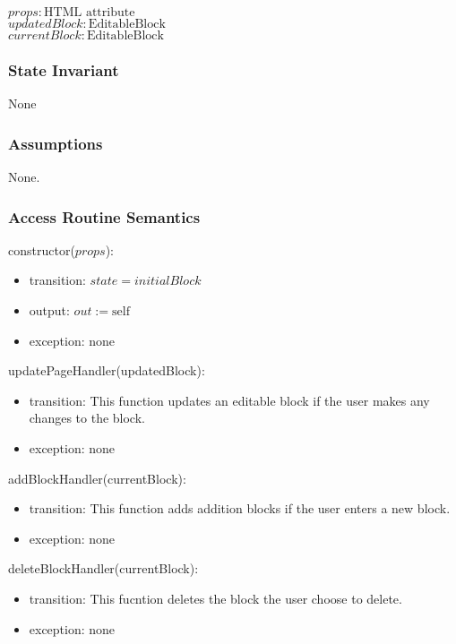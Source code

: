 \documentclass[12pt, titlepage]{article}
\begin{document}
$\mathit{props}: \text{HTML attribute}$\\
$\mathit{updatedBlock}: \text{EditableBlock}$\\
$\mathit{currentBlock}: \text{EditableBlock}$

\subsubsection{State Invariant}

None

\subsubsection{Assumptions}

None.

\subsubsection{Access Routine Semantics}

\noindent constructor($props$):
\begin{itemize}
\item transition: $\mathit{state} = initialBlock$
\item output: $out := \mbox{self}$
\item exception: none
\end{itemize}

\noindent updatePageHandler(updatedBlock):
\begin{itemize}
\item transition: This function updates an editable block if the user makes any changes to the block.
\item exception: none
\end{itemize}

\noindent addBlockHandler(currentBlock):
\begin{itemize}
\item transition: This function adds addition blocks if the user enters a new block.
\item exception: none
\end{itemize}

\noindent deleteBlockHandler(currentBlock):
\begin{itemize}
\item transition: This fucntion deletes the block the user choose to delete.
\item exception: none
\end{itemize}
\end{document}
